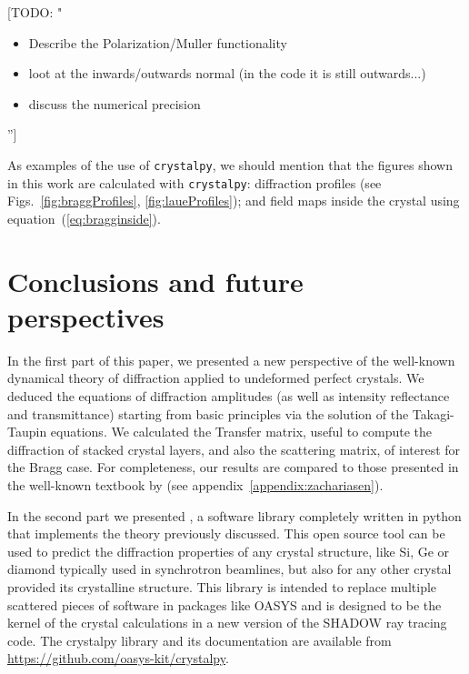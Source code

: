 \documentclass[preprint]{iucr}              %
\newcommand{\todo}[1]{{\color{red}[TODO: "#1'']}}
\begin{document}
\todo{ 
\begin{itemize}
    \item Describe the Polarization/Muller functionality
    \item loot at the inwards/outwards normal (in the code it is still outwards...)
    \item discuss the numerical precision 
\end{itemize}
}

As examples of the use of {\tt crystalpy}, we should mention that the figures shown in this work are calculated with {\tt crystalpy}: diffraction profiles (see Figs.~\ref{fig:braggProfiles}, \ref{fig:laueProfiles}); and field maps inside the crystal using equation~(\ref{eq:bragginside}). 


\section{Conclusions and future perspectives}
\label{sec:summary}

In the first part of this paper, we presented a new perspective of the well-known dynamical theory of diffraction applied to undeformed perfect crystals. We deduced the equations of diffraction amplitudes (as well as intensity reflectance and transmittance) starting from basic principles via the solution of the Takagi-Taupin equations. We calculated the Transfer matrix, useful to compute the diffraction of stacked crystal layers, and also the scattering matrix, of interest for the Bragg case. For completeness, our results are compared to those presented in the well-known textbook by \cite{ZachariasenBook} (see appendix~\ref{appendix:zachariasen}).

In the second part we presented {\ttcrystalpy}, a software library completely written in python that implements the theory previously discussed. This open source tool can be used to predict the diffraction properties of any crystal structure, like Si, Ge or diamond typically used in synchrotron beamlines, but also for any other crystal provided its crystalline structure. This library is intended to replace multiple scattered pieces of software in packages like OASYS \cite{codeOASYS} and is designed to be the kernel of the crystal calculations in a new version of the SHADOW \cite{codeSHADOW} ray tracing code. The crystalpy library and its documentation are available from \url{https://github.com/oasys-kit/crystalpy}. 
\end{document}
